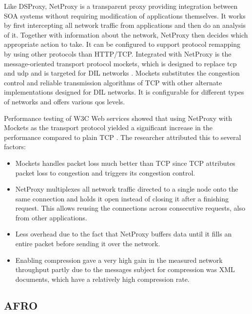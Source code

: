 Like DSProxy, NetProxy is a transparent proxy providing integration between SOA
systems without requiring modification of applications themselves. It works by
first intercepting all network traffic from applications and then do an analysis
of it. Together with information about the network, NetProxy then decides which
appropriate action to take. It can be configured to support protocol remapping
by using other protocols than HTTP/TCP. Integrated with NetProxy is the
message-oriented transport protocol \gls{mockets}, which is designed to replace
\gls{tcp} and \gls{udp} and is targeted for DIL networks \cite{suri-netproxy}.
Mockets substitutes the congestion control and reliable transmission algorithms
of TCP with other alternate implementations designed for DIL networks. It is
configurable for different types of networks and offers various \gls{qos}
levels.

Performance testing of W3C Web services showed that using NetProxy with Mockets as
the transport protocol yielded a significant increase in the performance
compared to plain TCP \cite{suri-netproxy}. The researcher attributed this to
several factors:

\begin{itemize}

    \item Mockets handles packet loss much better than TCP since TCP attributes
    packet loss to congestion and triggers its congestion control.

    \item NetProxy multiplexes all network traffic directed to a single node
    onto the same connection and holds it open instead of closing it after a
    finishing request. This allows reusing the connections across consecutive
    requests, also from other applications.

    \item Less overhead due to the fact that NetProxy buffers data until it fills an
    entire packet before sending it over the network.

    \item Enabling compression gave a very high gain in the measured network
    throughput partly due to the messages subject for compression was XML
    documents, which have a relatively high compression rate.

\end{itemize}

\subsection{AFRO}

